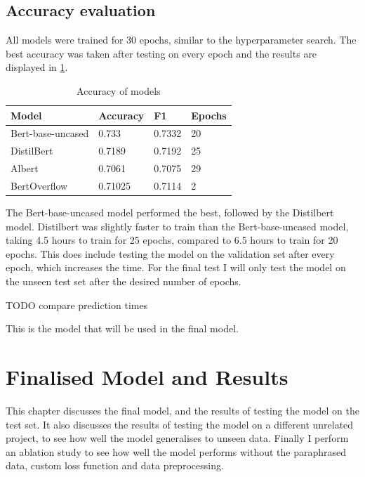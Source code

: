\documentclass{UoYCSproject}
\begin{document}
    \section{Accuracy evaluation}\label{sec:accuracy-evaluation}
    All models were trained for 30 epochs, similar to the hyperparameter search. The best accuracy was taken after testing on every epoch and the results are displayed in \ref{tab:accuracy}. \par
    \begin{table}[h]
    \centering
    \begin{tabular}{@{}|l|l|l|l|@{}}
    \toprule
    Model             & Accuracy & F1     & Epochs \\ \midrule
    Bert-base-uncased & 0.733    & 0.7332 & 20     \\ \midrule
    DistilBert        & 0.7189   & 0.7192 & 25     \\ \midrule
    Albert            & 0.7061   & 0.7075 & 29     \\ \midrule
    BertOverflow      & 0.71025  & 0.7114 & 2      \\ \bottomrule
    \end{tabular}
    \caption[Accuracy of models]{Accuracy of models} \label{tab:accuracy}
    \end{table}

    The Bert-base-uncased model performed the best, followed by the Distilbert model.
    Distilbert was slightly faster to train than the Bert-base-uncased model, taking 4.5 hours to train for 25 epochs, compared to 6.5 hours to train for 20 epochs.
    This does include testing the model on the validation set after every epoch, which increases the time. For the final test I will only test the model on the unseen test set after the desired number of epochs.

    TODO compare prediction times

    This is the model that will be used in the final model. \par


    \chapter{Finalised Model and Results }
    \label{ch:results}

    This chapter discusses the final model, and the results of testing the model on the test set.
    It also discusses the results of testing the model on a different unrelated project, to see how well the model generalises to unseen data.
    Finally I perform an ablation study to see how well the model performs without the paraphrased data, custom loss function and data preprocessing.
\end{document}
